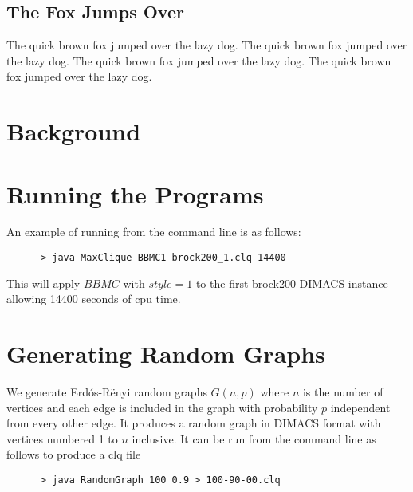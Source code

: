 \documentclass{l4proj}
\begin{document}
\section{The Fox Jumps Over}
The quick brown fox jumped over the lazy dog.
The quick brown fox jumped over the lazy dog.
The quick brown fox jumped over the lazy dog.
The quick brown fox jumped over the lazy dog.


\chapter{Background}



\chapter{Running the Programs}
An example of running from the command line is as follows:
\begin{verbatim}
      > java MaxClique BBMC1 brock200_1.clq 14400
\end{verbatim}
This will apply $BBMC$ with $style = 1$ to the first brock200 DIMACS instance allowing 14400 seconds of cpu time.

\chapter{Generating Random Graphs}
\label{sec:randomGraph}
We generate Erd\'{o}s-R\"{e}nyi random graphs $G(n,p)$ where $n$ is the number of vertices and
each edge is included in the graph with probability $p$ independent from every other edge. It produces
a random graph in DIMACS format with vertices numbered 1 to $n$ inclusive. It can be run from the command line as follows to produce 
a clq file
\begin{verbatim}
      > java RandomGraph 100 0.9 > 100-90-00.clq
\end{verbatim}




\end{document}
